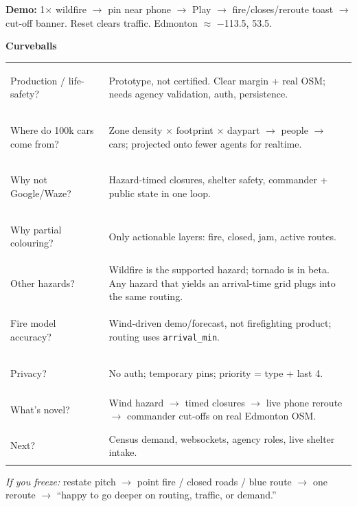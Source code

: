 \documentclass[9pt]{extarticle}
\begin{document}
\vspace{3pt}
{\bfseries Demo:} 1$\times$ wildfire $\to$ pin near phone $\to$ Play $\to$ fire/closes/reroute toast $\to$ cut-off banner. Reset clears traffic. Edmonton $\approx$ $-$113.5, 53.5.

\vspace{2pt}
{\bfseries\large Curveballs}\\[2pt]
\renewcommand{\arraystretch}{1.12}
\begin{tabularx}{\textwidth}{@{}>{\bfseries\raggedright\arraybackslash}p{}X@{}}
Production / life-safety? & Prototype, not certified. Clear margin + real OSM; needs agency validation, auth, persistence. \\
Where do 100k cars come from? & Zone density $\times$ footprint $\times$ daypart $\to$ people $\to$ cars; projected onto fewer agents for realtime. \\
Why not Google/Waze? & Hazard-timed closures, shelter safety, commander + public state in one loop. \\
Why partial colouring? & Only actionable layers: fire, closed, jam, active routes. \\
Other hazards? & Wildfire is the supported hazard; tornado is in beta. Any hazard that yields an arrival-time grid plugs into the same routing. \\
Fire model accuracy? & Wind-driven demo/forecast, not firefighting product; routing uses \texttt{arrival\_min}. \\
Privacy? & No auth; temporary pins; priority = type + last 4. \\
What's novel? & Wind hazard $\to$ timed closures $\to$ live phone reroute $\to$ commander cut-offs on real Edmonton OSM. \\
Next? & Census demand, websockets, agency roles, live shelter intake. \\
\end{tabularx}

\vspace{4pt}
\textit{If you freeze:} restate pitch $\to$ point fire / closed roads / blue route $\to$ one reroute $\to$ ``happy to go deeper on routing, traffic, or demand.''
\end{document}
